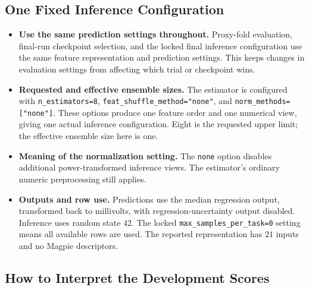 \documentclass[11pt]{article}
\newenvironment{notes}
  {\begin{itemize}\setlength{\itemsep}{0.45em}\setlength{\parsep}{0pt}}
  {\end{itemize}}
\begin{document}
\subsection{One Fixed Inference Configuration}
\label{sec:selection-inference-settings}

\begin{notes}
    \item \textbf{Use the same prediction settings throughout.}
    Proxy-fold evaluation, final-run checkpoint selection,
    and the locked final inference configuration use the
    same feature representation and prediction settings.
    This keeps changes in evaluation settings from affecting
    which trial or checkpoint wins.

    \item \textbf{Requested and effective ensemble sizes.}
    The estimator is configured with
    \texttt{n\_estimators=8},
    \texttt{feat\_shuffle\_method="none"}, and
    \texttt{norm\_methods=["none"]}.
    These options produce one feature order and one numerical
    view, giving one actual inference configuration.
    Eight is the requested upper limit; the effective
    ensemble size here is one.

    \item \textbf{Meaning of the normalization setting.}
    The \texttt{none} option disables additional
    power-transformed inference views. The estimator's
    ordinary numeric preprocessing still applies.

    \item \textbf{Outputs and row use.}
    Predictions use the median regression output, transformed
    back to millivolts, with regression-uncertainty output
    disabled. Inference uses random state \(42\).
    The locked \texttt{max\_samples\_per\_task=0} setting
    means all available rows are used.
    The reported representation has \(21\) inputs and no
    Magpie descriptors.
\end{notes}

\subsection{How to Interpret the Development Scores}
\label{sec:development-score-interpretation}
\end{document}
